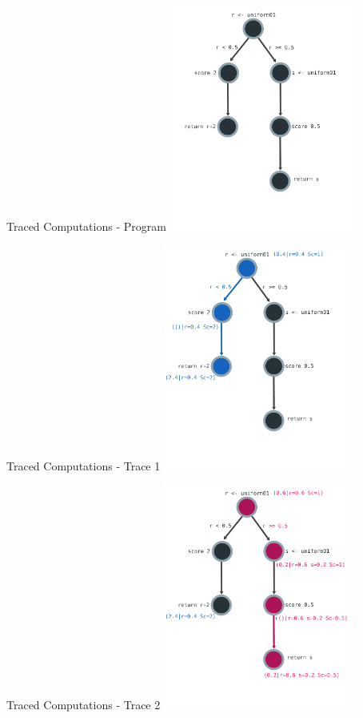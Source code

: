 \documentclass{beamer}
\begin{document}
\begin{frame}[fragile]{Traced Computations - Program}
\includegraphics[height=280px]{res/program-1.pdf}
\end{frame}

\begin{frame}[fragile]{Traced Computations - Trace 1}
\includegraphics[height=280px]{res/program-2.pdf}
\end{frame}


\begin{frame}[fragile]{Traced Computations - Trace 2}
\includegraphics[height=280px]{res/program-3.pdf}
\end{frame}
\end{document}
